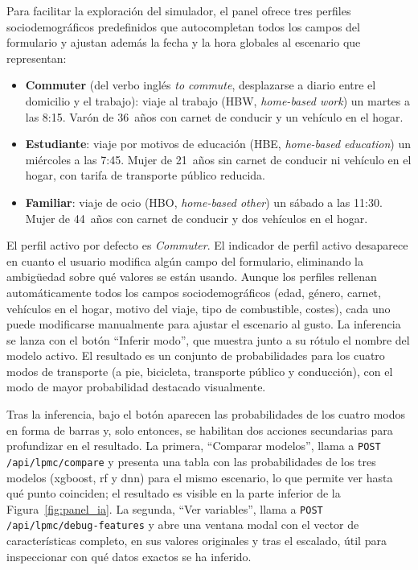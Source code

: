 Para facilitar la exploración del simulador, el panel ofrece tres perfiles sociodemográficos predefinidos que autocompletan todos los campos del formulario y ajustan además la fecha y la hora globales al escenario que representan:

\begin{itemize}
  \item \textbf{Commuter} (del verbo inglés \textit{to commute}, desplazarse a diario entre el domicilio y el trabajo): viaje al trabajo (HBW, \textit{home-based work}) un martes a las 8:15. Varón de 36~años con carnet de conducir y un vehículo en el hogar.
  \item \textbf{Estudiante}: viaje por motivos de educación (HBE, \textit{home-based education}) un miércoles a las 7:45. Mujer de 21~años sin carnet de conducir ni vehículo en el hogar, con tarifa de transporte público reducida.
  \item \textbf{Familiar}: viaje de ocio (HBO, \textit{home-based other}) un sábado a las 11:30. Mujer de 44~años con carnet de conducir y dos vehículos en el hogar.
\end{itemize}

El perfil activo por defecto es \textit{Commuter}. El indicador de perfil activo desaparece en cuanto el usuario modifica algún campo del formulario, eliminando la ambigüedad sobre qué valores se están usando. Aunque los perfiles rellenan automáticamente todos los campos sociodemográficos (edad, género, carnet, vehículos en el hogar, motivo del viaje, tipo de combustible, costes), cada uno puede modificarse manualmente para ajustar el escenario al gusto. La inferencia se lanza con el botón ``Inferir modo'', que muestra junto a su rótulo el nombre del modelo activo. El resultado es un conjunto de probabilidades para los cuatro modos de transporte (a pie, bicicleta, transporte público y conducción), con el modo de mayor probabilidad destacado visualmente.\newline

Tras la inferencia, bajo el botón aparecen las probabilidades de los cuatro modos en forma de barras y, solo entonces, se habilitan dos acciones secundarias para profundizar en el resultado. La primera, ``Comparar modelos'', llama a \texttt{POST /api/lpmc/compare} y presenta una tabla con las probabilidades de los tres modelos (\gls{xgboost}, \gls{rf} y \gls{dnn}) para el mismo escenario, lo que permite ver hasta qué punto coinciden; el resultado es visible en la parte inferior de la Figura~\ref{fig:panel_ia}. La segunda, ``Ver variables'', llama a \texttt{POST /api/lpmc/debug-features} y abre una ventana modal con el vector de características completo, en sus valores originales y tras el escalado, útil para inspeccionar con qué datos exactos se ha inferido.

